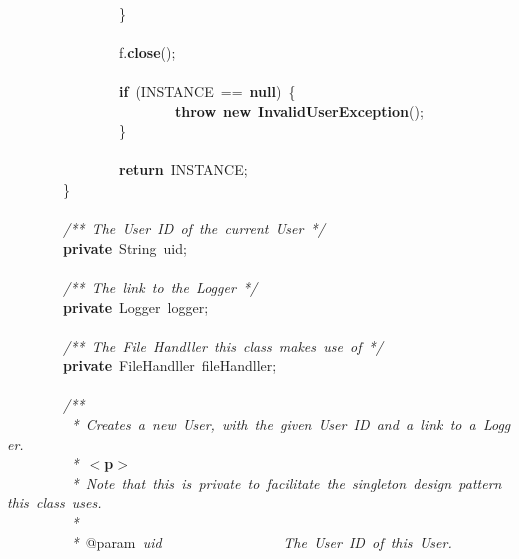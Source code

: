 \mbox{}\ \ \ \ \ \ \ \ \ \ \ \ \ \ \ \ \ \ \ \ \ \ \ \  \\
\mbox{}\ \ \ \ \ \ \ \ \ \ \ \ \ \ \ \ \} \\
\mbox{}\ \ \ \ \ \ \ \ \ \ \ \ \ \ \ \  \\
\mbox{}\ \ \ \ \ \ \ \ \ \ \ \ \ \ \ \ f.\textbf{close}(); \\
\mbox{} \\
\mbox{}\ \ \ \ \ \ \ \ \ \ \ \ \ \ \ \ \textbf{if}\ (INSTANCE\ ==\ \textbf{null})\ \{ \\
\mbox{}\ \ \ \ \ \ \ \ \ \ \ \ \ \ \ \ \ \ \ \ \ \ \ \ \textbf{throw}\ \textbf{new}\ \textbf{InvalidUserException}(); \\
\mbox{}\ \ \ \ \ \ \ \ \ \ \ \ \ \ \ \ \} \\
\mbox{} \\
\mbox{}\ \ \ \ \ \ \ \ \ \ \ \ \ \ \ \ \textbf{return}\ INSTANCE; \\
\mbox{}\ \ \ \ \ \ \ \ \} \\
\mbox{} \\
\mbox{}\ \ \ \ \ \ \ \ \textit{/**\ The\ User\ ID\ of\ the\ current\ User\ */} \\
\mbox{}\ \ \ \ \ \ \ \ \textbf{private}\ String\ uid; \\
\mbox{} \\
\mbox{}\ \ \ \ \ \ \ \ \textit{/**\ The\ link\ to\ the\ Logger\ */} \\
\mbox{}\ \ \ \ \ \ \ \ \textbf{private}\ Logger\ logger; \\
\mbox{} \\
\mbox{}\ \ \ \ \ \ \ \ \textit{/**\ The\ File\ Handller\ this\ class\ makes\ use\ of\ */} \\
\mbox{}\ \ \ \ \ \ \ \ \textbf{private}\ FileHandller\ fileHandller; \\
\mbox{} \\
\mbox{}\ \ \ \ \ \ \ \ \textit{/**} \\
\mbox{}\textit{\ \ \ \ \ \ \ \ \ *\ Creates\ a\ new\ User,\ with\ the\ given\ User\ ID\ and\ a\ link\ to\ a\ Logger.} \\
\mbox{}\textit{\ \ \ \ \ \ \ \ \ *\ }\textbf{$<$p$>$} \\
\mbox{}\textit{\ \ \ \ \ \ \ \ \ *\ Note\ that\ this\ is\ private\ to\ facilitate\ the\ singleton\ design\ pattern\ this\ class\ uses.} \\
\mbox{}\textit{\ \ \ \ \ \ \ \ \ *} \\
\mbox{}\textit{\ \ \ \ \ \ \ \ \ *\ }@param\textit{\ uid\ \ \ \ \ \ \ \ \ \ \ \ \ \ \ \ \ The\ User\ ID\ of\ this\ User.} \\
